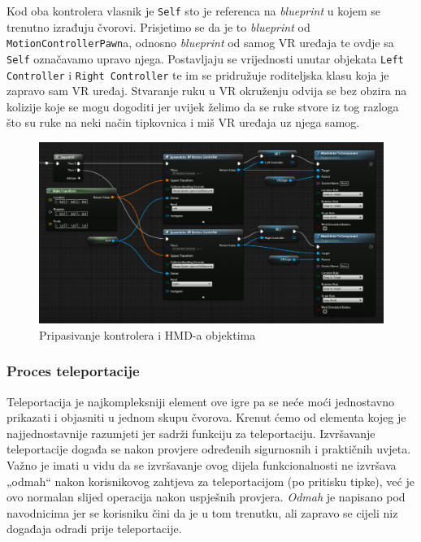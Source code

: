 \documentclass[a4paper,10pt]{article}
\begin{document}
Kod oba kontrolera
vlasnik je \texttt{Self} sto je referenca na \textit{blueprint} u kojem se trenutno izrađuju
čvorovi. Prisjetimo se da je to \textit{blueprint} od
\texttt{MotionControllerPawn}a,  odnosno
\textit{blueprint} od samog VR uređaja te ovdje sa \texttt{Self} označavamo upravo njega.
Postavljaju se vrijednosti unutar objekata \texttt{Left Controller} i \texttt{Right
Controller} te im se pridružuje roditeljska klasu koja je zapravo sam VR
uređaj. Stvaranje ruku u VR okruženju odvija se bez obzira na kolizije koje se
mogu dogoditi jer uvijek želimo da se ruke stvore iz tog razloga što su ruke na
neki način tipkovnica i miš VR uređaja uz njega samog.

\begin{figure}[!h]
	\centering
	\includegraphics[width=1\textwidth]{slike/03.png}
	\caption{Pripasivanje kontrolera i HMD-a objektima}
\end{figure}

\subsubsection{Proces teleportacije}

Teleportacija je najkompleksniji element ove igre pa se neće moći jednostavno
prikazati i objasniti u jednom skupu čvorova. Krenut ćemo od elementa kojeg je
najjednostavnije razumjeti jer sadrži funkciju za teleportaciju. Izvršavanje
teleportacije događa se nakon provjere određenih sigurnosnih i praktičnih
uvjeta. Važno je imati u vidu
da se izvršavanje ovog dijela funkcionalnosti ne izvršava „odmah“ nakon
korisnikovog zahtjeva za teleportacijom (po pritisku tipke),
već je ovo normalan slijed operacija nakon uspješnih provjera. \textit{Odmah} je
napisano pod navodnicima jer se korisniku čini da je u tom trenutku, ali
zapravo se cijeli niz događaja odradi prije teleportacije.
\end{document}
